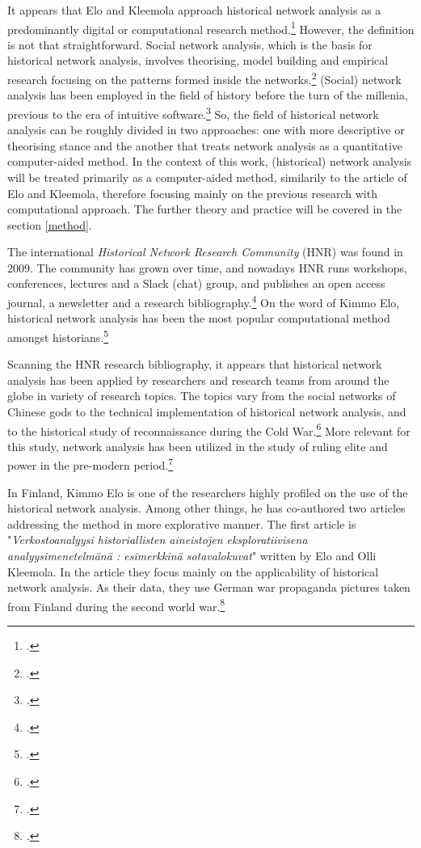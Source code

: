 It appears that Elo and Kleemola approach historical network analysis as a predominantly digital or computational research method.\footcite[pp. 415-417.]{eloAklee15} However, the definition is not that straightforward. Social network analysis, which is the basis for historical network analysis, involves theorising, model building and empirical research focusing on the patterns formed inside the networks.\footcite[pp. 22-24.]{Keats-R2007} (Social) network analysis has been employed in the field of history before the turn of the millenia, previous to the era of intuitive software.\footcite[TODO check!]{AronssonEtA1999} So, the field of historical network analysis can be roughly divided in two approaches: one with more descriptive or theorising stance and the another that treats network analysis as a quantitative computer-aided method. In the context of this work, (historical) network analysis will be treated primarily as a computer-aided method, similarily to the article of Elo and Kleemola, therefore focusing mainly on the previous research with computational approach. The further theory and practice will be covered in the section \ref{method}.

The international \textit{Historical Network Research Community} (HNR) was found in 2009. The community has grown over time, and nowadays HNR runs workshops, conferences, lectures and a Slack (chat) group, and publishes an open access journal, a newsletter and a research bibliography.\footcite{hnr} On the word of Kimmo Elo, historical network analysis has been the most popular computational method amongst historians.\footcite[p. 22.]{elo16} 

Scanning the HNR research bibliography, it appears that historical network analysis has been applied by researchers and research teams from around the globe in variety of research topics. The topics vary from the social networks of Chinese gods to the technical implementation of historical network analysis, and to the historical study of reconnaissance during the Cold War.\footcites[p. 22.]{elo16}{hnrbib} More relevant for this study, network analysis has been utilized in the study of ruling elite and power in the pre-modern period.\footcite[See e. g. Ruth Ahnert's and Sebastian E. Ahnert's book \textit{Tudor Networks of Power} (2023) or Paul D Mclean's article \textit{Widening Access While Tightening Control: Office-Holding, Marriages, and Elite Consolidation in Early Modern Poland} (2004).]{JonVidarEt} 
 
In Finland, Kimmo Elo is one of the researchers highly profiled on the use of the historical network analysis. Among other things, he has co-authored two articles addressing the method in more explorative manner. The first article is "\textit{Verkostoanalyysi historiallisten aineistojen eksploratiivisena analyysimenetelmänä : esimerkkinä sotavalokuvat}" written by Elo and Olli Kleemola. In the article they focus mainly on the applicability of historical network analysis. As their data, they use German war propaganda pictures taken from Finland during the second world war.\footcite{eloAklee15}

